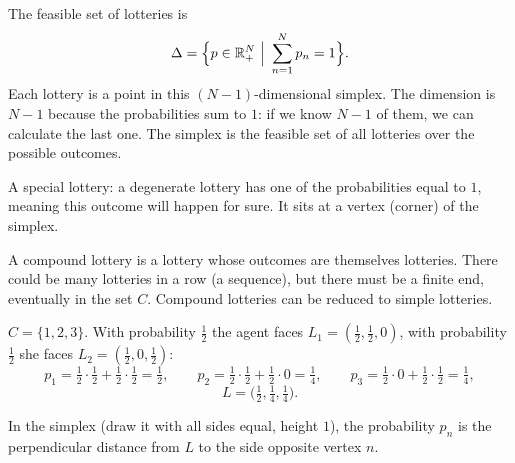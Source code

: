 \documentclass[11pt]{article}
\begin{document}
The feasible set of lotteries is
\[ \Delta=\Bigl\{p\in\R^{N}_{+}\ \Big|\ \sum_{n=1}^{N}p_n=1\Bigr\}. \]
Each lottery is a point in this $(N-1)$-dimensional simplex. The dimension is $N-1$
because the probabilities sum to $1$: if we know $N-1$ of them, we can calculate the
last one. The simplex is the feasible set of all lotteries over the possible
outcomes.

A special lottery: a degenerate lottery has one of the probabilities equal to $1$,
meaning this outcome will happen for sure. It sits at a vertex (corner) of the
simplex.

A compound lottery is a lottery whose outcomes are themselves lotteries. There could
be many lotteries in a row (a sequence), but there must be a finite end, eventually
in the set $C$. Compound lotteries can be reduced to simple lotteries.

 $C=\{1,2,3\}$. With probability $\tfrac12$ the agent faces
$L_1=(\tfrac12,\tfrac12,0)$, with probability $\tfrac12$ she faces
$L_2=(\tfrac12,0,\tfrac12)$:
\[ p_1=\tfrac12\cdot\tfrac12+\tfrac12\cdot\tfrac12=\tfrac12,\qquad
   p_2=\tfrac12\cdot\tfrac12+\tfrac12\cdot 0=\tfrac14,\qquad
   p_3=\tfrac12\cdot 0+\tfrac12\cdot\tfrac12=\tfrac14, \]
\[ L=\bigl(\tfrac12,\tfrac14,\tfrac14\bigr). \]

\begin{center}
\end{center}
In the simplex (draw it with all sides equal, height $1$), the probability $p_n$ is
the perpendicular distance from $L$ to the side opposite vertex $n$.
\end{document}

